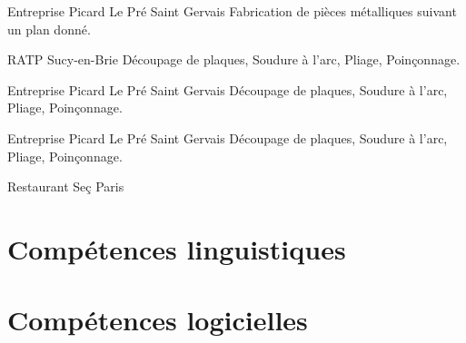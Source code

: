 \documentclass[11pt,a4paper]{moderncv}
\begin{document}
{Entreprise Picard}
{Le Pré Saint Gervais}{}
{Fabrication de pièces métalliques suivant un plan donné.}

{RATP}
{Sucy-en-Brie}{}
{Découpage de plaques, Soudure à l'arc, Pliage, Poinçonnage.}


{Entreprise Picard}
{Le Pré Saint Gervais}{}
{Découpage de plaques, Soudure à l'arc, Pliage, Poinçonnage.}


{Entreprise Picard}
{Le Pré Saint Gervais}{}
{Découpage de plaques, Soudure à l'arc, Pliage, Poinçonnage.}

{Restaurant Seç}
{Paris}{}
{}


\section{Compétences linguistiques}

\section{Compétences logicielles}

\renewcommand{\listitemsymbol}{-} %
\end{document}
